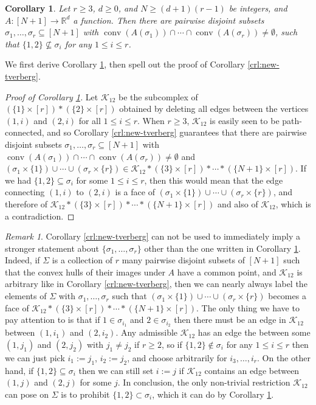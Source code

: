 \documentclass[a4paper,11pt,reqno, english]{amsart}
\newtheorem{corollary}[theorem]{Corollary}
\theoremstyle{definition}
\theoremstyle{remark}
\newtheorem{remark}[theorem]{Remark}
\newcommand\R{\mathbb R}
\DeclareMathOperator{\conv}{\mathrm{conv}}
\begin{document}
\begin{corollary}\label{crl:new-unordered-tverberg}
    Let $r\geq 3$, $d\geq 0$, and $N\geq (d+1)(r-1)$ be integers, and $A\colon [N+1]\to\R^d$ a function. Then there are pairwise disjoint subsets $\sigma_1,\ldots,\sigma_r\subseteq[N+1]$ with $\conv(A(\sigma_1))\cap\cdots\cap\conv(A(\sigma_r))\neq\emptyset$, such that $\{1,2\}\nsubseteq\sigma_i$ for any $1\leq i\leq r$.
\end{corollary}
We first derive Corollary \ref{crl:new-unordered-tverberg}, then spell out the proof of Corollary \ref{crl:new-tverberg}.
\begin{proof}[Proof of Corollary \ref{crl:new-unordered-tverberg}]
    Let $\mathscr{K}_{12}$ be the subcomplex of $(\{1\}\times[r])*(\{2\}\times [r])$ obtained by deleting all edges between the vertices $(1,i)$ and $(2,i)$ for all $1\leq i\leq r$. When $r\geq 3$, $\mathscr{K}_{12}$ is easily seen to be path-connected, and so Corollary \ref{crl:new-tverberg} guarantees that there are pairwise disjoint subsets $\sigma_1,\ldots,\sigma_r\subseteq[N+1]$ with $\conv(A(\sigma_1))\cap\cdots\cap\conv(A(\sigma_r))\neq\emptyset$ and $(\sigma_1\times\{1\})\cup\cdots\cup(\sigma_r\times\{r\})\in\mathscr{K}_{12}*(\{3\}\times[r])*\cdots*(\{N+1\}\times[r])$. If we had $\{1,2\}\subseteq\sigma_i$ for some $1\leq i\leq r$, then this would mean that the edge connecting $(1,i)$ to $(2,i)$ is a face of $(\sigma_1\times\{1\})\cup\cdots\cup(\sigma_r\times\{r\})$, and therefore of $\mathscr{K}_{12}*(\{3\}\times[r])*\cdots*(\{N+1\}\times[r])$ and also of $\mathscr{K}_{12}$, which is a contradiction.
\end{proof}
\begin{remark}
    Corollary \ref{crl:new-tverberg} can not be used to immediately imply a stronger statement about $\{\sigma_1,\ldots,\sigma_r\}$ other than the one written in Corollary \ref{crl:new-unordered-tverberg}. Indeed, if $\Sigma$ is a collection of $r$ many pairwise disjoint subsets of ${[N+1]}$ such that the convex hulls of their images under $A$ have a common point, and $\mathscr{K}_{12}$ is arbitrary like in Corollary \ref{crl:new-tverberg}, then we can nearly always label the elements of $\Sigma$ with $\sigma_1,\ldots,\sigma_r$ such that $(\sigma_1\times\{1\})\cup\cdots\cup(\sigma_r\times\{r\})$ becomes a face of $\mathscr{K}_{12}*(\{3\}\times[r])*\cdots*(\{N+1\}\times[r])$. The only thing we have to pay attention to is that if $1\in\sigma_{i_1}$ and $2\in\sigma_{i_2}$ then there must be an edge in $\mathscr{K}_{12}$ between $(1,i_1)$ and $(2,i_2)$. Any admissible $\mathscr{K}_{12}$ has an edge the between some $(1,j_1)$ and $(2,j_2)$ with $j_1\neq j_2$ if $r\geq 2$, so if $\{1,2\}\notin\sigma_i$ for any $1\leq i\leq r$ then we can just pick $i_1:=j_1$, $i_2:=j_2$, and choose arbitrarily for $i_3,\ldots,i_r$. On the other hand, if $\{1,2\}\subseteq\sigma_i$ then we can still set $i:=j$ if $\mathscr{K}_{12}$ contains an edge between $(1,j)$ and $(2,j)$ for some $j$. In conclusion, the only non-trivial restriction $\mathscr{K}_{12}$ can pose on $\Sigma$ is to prohibit $\{1,2\}\subset\sigma_i$, which it can do by Corollary \ref{crl:new-unordered-tverberg}.
 \end{remark}
\end{document}
